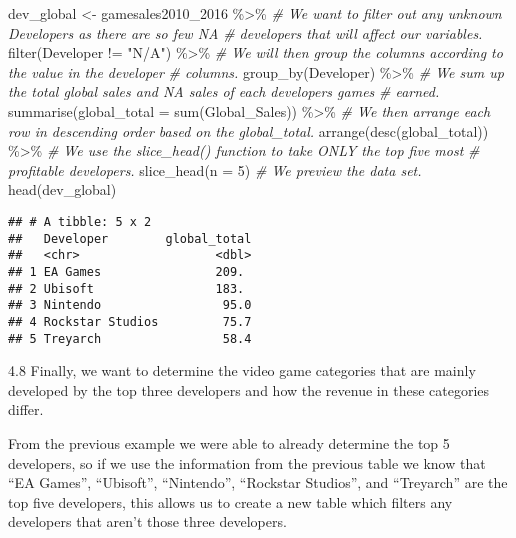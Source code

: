 \documentclass[
]{article}
\newenvironment{Shaded}{\begin{snugshade}}{\end{snugshade}}
\newcommand{\AttributeTok}[1]{\textcolor[rgb]{0.77,0.63,0.00}{#1}}
\newcommand{\CommentTok}[1]{\textcolor[rgb]{0.56,0.35,0.01}{\textit{#1}}}
\newcommand{\DecValTok}[1]{\textcolor[rgb]{0.00,0.00,0.81}{#1}}
\newcommand{\FunctionTok}[1]{\textcolor[rgb]{0.00,0.00,0.00}{#1}}
\newcommand{\NormalTok}[1]{#1}
\newcommand{\OtherTok}[1]{\textcolor[rgb]{0.56,0.35,0.01}{#1}}
\newcommand{\SpecialCharTok}[1]{\textcolor[rgb]{0.00,0.00,0.00}{#1}}
\newcommand{\StringTok}[1]{\textcolor[rgb]{0.31,0.60,0.02}{#1}}
\begin{document}
\begin{Shaded}
\begin{Highlighting}[]
\NormalTok{dev\_global }\OtherTok{\textless{}{-}}\NormalTok{ gamesales2010\_2016 }\SpecialCharTok{\%\textgreater{}\%}
    \CommentTok{\# We want to filter out any unknown Developers as there are so few NA}
    \CommentTok{\# developers that will affect our variables.}
\FunctionTok{filter}\NormalTok{(Developer }\SpecialCharTok{!=} \StringTok{"N/A"}\NormalTok{) }\SpecialCharTok{\%\textgreater{}\%}
    \CommentTok{\# We will then group the columns according to the value in the developer}
    \CommentTok{\# columns.}
\FunctionTok{group\_by}\NormalTok{(Developer) }\SpecialCharTok{\%\textgreater{}\%}
    \CommentTok{\# We sum up the total global sales and NA sales of each developers games}
    \CommentTok{\# earned.}
\FunctionTok{summarise}\NormalTok{(}\AttributeTok{global\_total =} \FunctionTok{sum}\NormalTok{(Global\_Sales)) }\SpecialCharTok{\%\textgreater{}\%}
    \CommentTok{\# We then arrange each row in descending order based on the global\_total.}
\FunctionTok{arrange}\NormalTok{(}\FunctionTok{desc}\NormalTok{(global\_total)) }\SpecialCharTok{\%\textgreater{}\%}
    \CommentTok{\# We use the slice\_head() function to take ONLY the top five most}
    \CommentTok{\# profitable developers.}
\FunctionTok{slice\_head}\NormalTok{(}\AttributeTok{n =} \DecValTok{5}\NormalTok{)}
\CommentTok{\# We preview the data set.}
\FunctionTok{head}\NormalTok{(dev\_global)}
\end{Highlighting}
\end{Shaded}

\begin{verbatim}
## # A tibble: 5 x 2
##   Developer        global_total
##   <chr>                   <dbl>
## 1 EA Games                209. 
## 2 Ubisoft                 183. 
## 3 Nintendo                 95.0
## 4 Rockstar Studios         75.7
## 5 Treyarch                 58.4
\end{verbatim}

4.8 Finally, we want to determine the video game categories that are
mainly developed by the top three developers and how the revenue in
these categories differ.

From the previous example we were able to already determine the top 5
developers, so if we use the information from the previous table we know
that ``EA Games'', ``Ubisoft'', ``Nintendo'', ``Rockstar Studios'', and
``Treyarch'' are the top five developers, this allows us to create a new
table which filters any developers that aren't those three developers.
\end{document}

